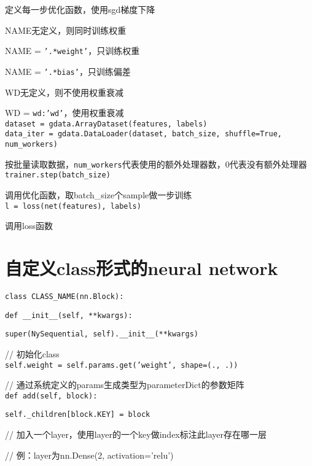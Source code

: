 \documentclass[UTF8]{ctexart}
\begin{document}
  定义每一步优化函数，使用sgd梯度下降
  
  NAME无定义，则同时训练权重
  
  \quad NAME = \texttt{'.*weight'}，只训练权重 
  
  \quad NAME = \texttt{'.*bias'}，只训练偏差
    
  WD无定义，则不使用权重衰减
  
  \quad WD = \texttt{wd:'wd'}，使用权重衰减\\
\texttt{dataset = gdata.ArrayDataset(features, labels)}\\
\texttt{data\_iter = gdata.DataLoader(dataset, batch\_size, shuffle=True, num\_workers)}

  按批量读取数据，\texttt{num\_workers}代表使用的额外处理器数，0代表没有额外处理器\\
\texttt{trainer.step(batch\_size)}

  调用优化函数，取batch\_size个sample做一步训练\\
\texttt{l = loss(net(features), labels)}

  调用loss函数

\section{自定义class形式的neural network}
\noindent \texttt{class CLASS\_NAME(nn.Block):}

  \texttt{def \_\_init\_\_(self, **kwargs):}

  \quad \texttt{super(NySequential, self).\_\_init\_\_(**kwargs)}

  // 初始化class\\

  \quad \texttt{self.weight = self.params.get('weight', shape=(., .))}

  // 通过系统定义的params生成类型为parameterDict的参数矩阵\\

  \texttt{def add(self, block):}

  \quad \texttt{self.\_children[block.KEY] = block}

  // 加入一个layer，使用layer的一个key做index标注此layer存在哪一层

  // 例：layer为nn.Dense(2, activation='relu')\\
\end{document}
